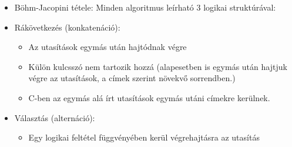 \documentclass[11pt,a4paper]{article}
\begin{document}
            \begin{tcolorbox}[colback=blue!5!white,colframe=blue!50!black,title= 16. Ismertesse az alapvető algoritmus-elemeket a Böhm-Jacopini tétel alapján!]
                \begin{itemize}
                    \item Böhm-Jacopini tétele: Minden algoritmus leírható 3 logikai struktúrával:
                    \item Rákövetkezés (konkatenáció):
                    \begin{itemize}
                        \item Az utasítások egymás után hajtódnak végre
                        \item Külön kulcsszó nem tartozik hozzá (alapesetben is egymás után hajtjuk végre az utasítások, a címek szerint növekvő sorrendben.) 
                        \item C-ben az egymás alá írt utasítások egymás utáni címekre kerülnek.
                        \begin{center}
                        \end{center}
                    \end{itemize}
                    \item Választás (alternáció):
                    \begin{itemize}
                        \item Egy logikai feltétel függvényében kerül végrehajtásra az utasítás

\end{itemize}
\end{itemize}
\end{tcolorbox}
\end{document}
